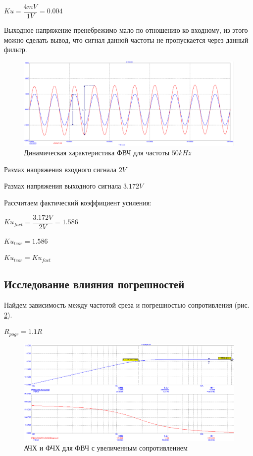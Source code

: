 \documentclass[a4paper,14pt]{article}
\begin{document}
$Ku = \dfrac{4mV}{1V} = 0.004$

Выходное напряжение пренебрежимо мало по отношению ко входному, из этого можно сделать вывод, что сигнал данной частоты не пропускается через данный фильтр.


\begin{figure}[H]
	\centering
	\includegraphics[width=0.95\linewidth]{../imgs/FVCH/garm_50k_V}
	\caption{Динамическая характеристика ФВЧ для частоты $50kHz$}
	\label{fig:garm50kv}
\end{figure}

Размах напряжения входного сигнала $2V$

Размах напряжения выходного сигнала $3.172V$

Рассчитаем фактический коэффициент усиления:

$Ku_{fact} = \dfrac{3.172V}{2V} = 1.586$

$Ku_{teor} = 1.586$

$Ku_{teor} = Ku_{fact}$


\subsection{Исследование влияния погрешностей}

Найдем зависимость между частотой среза и погрешностью сопротивления (рис. \ref{fig:pogrrv}). 

$R_{pogr} = 1.1R$

\begin{figure}[H]
	\centering
	\includegraphics[width=0.85\linewidth]{../imgs/FVCH/pogr_R_V}
	\caption{АЧХ и ФЧХ для ФВЧ с увеличенным сопротивлением}
	\label{fig:pogrrv}
\end{figure}
\end{document}
